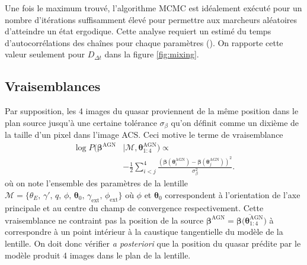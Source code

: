 \documentclass[times,10pt,twocolumn]{article}
\begin{document}
Une fois le maximum trouvé, l'algorithme MCMC est idéalement exécuté 
pour un nombre d'itérations suffisamment élevé pour permettre aux 
marcheurs aléatoires d'atteindre un état ergodique. Cette analyse requiert 
un estimé du temps d'autocorrélations des chaînes pour chaque paramètres 
(\cite{Goodman2010}). On rapporte cette valeur seulement 
pour $D_{\Delta t}$ dans la 
figure \ref{fig:mixing}.

\subsection{Vraisemblances}
Par supposition, les 4 images du quasar proviennent de la même position 
dans le plan source jusqu'à une certaine tolérance $\sigma_\beta$ 
qu'on définit comme 
un dixième de la taille d'un pixel dans l'image ACS.
Ceci motive le terme de vraisemblance 
\begin{align}
        \nonumber
        \log P(\boldsymbol{\beta}^{\mathrm{AGN}} &\mid \mathcal{M}, 
        \boldsymbol{\theta}^{\mathrm{AGN}}_{1:4}
        )
        \propto  \\
\label{eq:SourceLike} 
        &-\frac{1}{2} \sum_{i < j}^{4} 
        \frac{\left( 
                        \boldsymbol{\beta}(\boldsymbol{\theta}_i^{\mathrm{AGN}}) - 
                        \boldsymbol{\beta}(\boldsymbol{\theta}_j^{\mathrm{AGN}})
        \right)^2}{\sigma^2_{\beta}}.
\end{align} 
où on note l'ensemble des paramètres de la lentille 
$\mathcal{M} = \{\theta_E,\, \gamma',\, q,\, \phi,\, \boldsymbol{\theta}_0,\, 
\gamma_{\mathrm{ext}},\, \phi_{\mathrm{ext}}\}$ où $\phi$ et 
$\boldsymbol{\theta}_0$ correspondent à l'orientation de l'axe principale et 
au centre du champ de convergence respectivement.
Cette vraisemblance ne contraint pas la position de la source 
$\boldsymbol{\beta}^{\mathrm{AGN}} = \overline{\boldsymbol{\beta}(
\boldsymbol{\theta}^{\mathrm{AGN}}_{1:4}})$ à 
correspondre à un point intérieur à 
la caustique tangentielle du modèle de la lentille. 
On doit donc vérifier \textit{a posteriori} 
que la position du quasar 
prédite par le modèle produit 
4 images dans le plan de la lentille.
\end{document}
